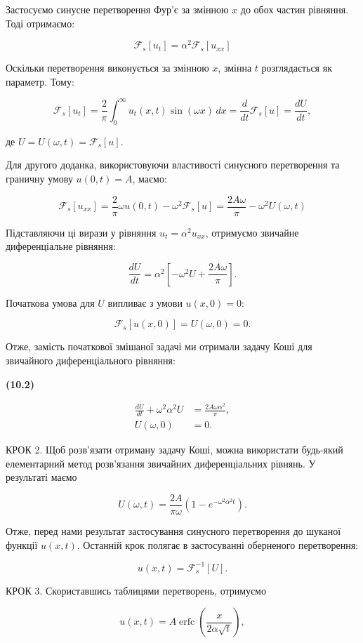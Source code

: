 \documentclass[
  ukrainian,
]{article}
\begin{document}
Застосуємо синусне перетворення Фур'є за змінною \(x\) до обох частин
рівняння. Тоді отримаємо:

\[
\mathcal{F}_s[u_t] = \alpha^2 \mathcal{F}_s[u_{xx}]
\]

Оскільки перетворення виконується за змінною \(x\), змінна \(t\)
розглядається як параметр. Тому:

\[
\mathcal{F}_s[u_t]  
= \frac{2}{\pi}\int_{0}^{\infty} u_t(x,t)\sin(\omega x)\,dx  
= \frac{d}{dt}\mathcal{F}_s[u]  
= \frac{dU}{dt},
\]

де \(U = U(\omega, t) = \mathcal{F}_s[u]\).

Для другого доданка, використовуючи властивості синусного перетворення
та граничну умову \(u(0,t)=A\), маємо:

\[
\mathcal{F}_s[u_{xx}] = \frac{2}{\pi}\omega u(0,t) - \omega^2 \mathcal{F}_s[u]  
= \frac{2A\omega}{\pi} - \omega^2 U(\omega,t)
\]

Підставляючи ці вирази у рівняння \(u_t = \alpha^2 u_{xx}\), отримуємо
звичайне диференціальне рівняння:

\[
\frac{dU}{dt} = \alpha^2\left[-\omega^2 U + \frac{2A\omega}{\pi}\right].
\]

Початкова умова для \(U\) випливає з умови \(u(x,0)=0\):

\[
\mathcal{F}_s[u(x,0)] = U(\omega,0) = 0.
\]

Отже, замість початкової змішаної задачі ми отримали задачу Коші для
звичайного диференціального рівняння:

\textbf{(10.2)}

\[
\begin{aligned}
\frac{dU}{dt} + \omega^2 \alpha^2 U &= \frac{2A\omega \alpha^2}{\pi}, \\
U(\omega,0) &= 0.
\end{aligned}
\]

КРОК 2. Щоб розв'язати отриману задачу Коші, можна використати будь-який
елементарний метод розв'язання звичайних диференціальних рівнянь. У
результаті маємо

\[
U(\omega,t)=\frac{2A}{\pi\omega}\left(1-e^{-\omega^2\alpha^2 t}\right).
\]

Отже, перед нами результат застосування синусного перетворення до
шуканої функції \(u(x,t)\). Останній крок полягає в застосуванні
оберненого перетворення:

\[
u(x,t)=\mathcal{F}_s^{-1}[U].
\]

КРОК 3. Скориставшись таблицями перетворень, отримуємо

\[
u(x,t)=A\operatorname{erfc}\!\left(\frac{x}{2\alpha\sqrt{t}}\right),
\]
\end{document}
